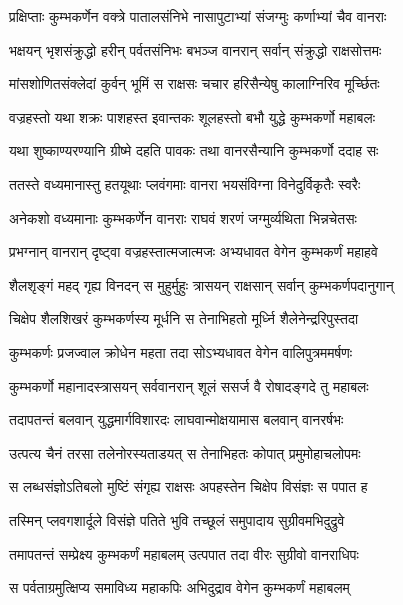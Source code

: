 \twolineshloka
{प्रक्षिप्ताः कुम्भकर्णेन वक्त्रे पातालसंनिभे}
{नासापुटाभ्यां संजग्मुः कर्णाभ्यां चैव वानराः} %

\twolineshloka
{भक्षयन् भृशसंक्रुद्धो हरीन् पर्वतसंनिभः}
{बभञ्ज वानरान् सर्वान् संक्रुद्धो राक्षसोत्तमः} %

\twolineshloka
{मांसशोणितसंक्लेदां कुर्वन् भूमिं स राक्षसः}
{चचार हरिसैन्येषु कालाग्निरिव मूर्च्छितः} %

\twolineshloka
{वज्रहस्तो यथा शक्रः पाशहस्त इवान्तकः}
{शूलहस्तो बभौ युद्धे कुम्भकर्णो महाबलः} %

\twolineshloka
{यथा शुष्काण्यरण्यानि ग्रीष्मे दहति पावकः}
{तथा वानरसैन्यानि कुम्भकर्णो ददाह सः} %

\twolineshloka
{ततस्ते वध्यमानास्तु हतयूथाः प्लवंगमाः}
{वानरा भयसंविग्ना विनेदुर्विकृतैः स्वरैः} %

\twolineshloka
{अनेकशो वध्यमानाः कुम्भकर्णेन वानराः}
{राघवं शरणं जग्मुर्व्यथिता भिन्नचेतसः} %

\twolineshloka
{प्रभग्नान् वानरान् दृष्ट्वा वज्रहस्तात्मजात्मजः}
{अभ्यधावत वेगेन कुम्भकर्णं महाहवे} %

\twolineshloka
{शैलशृङ्गं महद् गृह्य विनदन् स मुहुर्मुहुः}
{त्रासयन् राक्षसान् सर्वान् कुम्भकर्णपदानुगान्} %

\twolineshloka
{चिक्षेप शैलशिखरं कुम्भकर्णस्य मूर्धनि}
{स तेनाभिहतो मूर्ध्नि शैलेनेन्द्ररिपुस्तदा} %

\twolineshloka
{कुम्भकर्णः प्रजज्वाल क्रोधेन महता तदा}
{सोऽभ्यधावत वेगेन वालिपुत्रममर्षणः} %

\twolineshloka
{कुम्भकर्णो महानादस्त्रासयन् सर्ववानरान्}
{शूलं ससर्ज वै रोषादङ्गदे तु महाबलः} %

\twolineshloka
{तदापतन्तं बलवान् युद्धमार्गविशारदः}
{लाघवान्मोक्षयामास बलवान् वानरर्षभः} %

\twolineshloka
{उत्पत्य चैनं तरसा तलेनोरस्यताडयत्}
{स तेनाभिहतः कोपात् प्रमुमोहाचलोपमः} %

\twolineshloka
{स लब्धसंज्ञोऽतिबलो मुष्टिं संगृह्य राक्षसः}
{अपहस्तेन चिक्षेप विसंज्ञः स पपात ह} %

\twolineshloka
{तस्मिन् प्लवगशार्दूले विसंज्ञे पतिते भुवि}
{तच्छूलं समुपादाय सुग्रीवमभिदुद्रुवे} %

\twolineshloka
{तमापतन्तं सम्प्रेक्ष्य कुम्भकर्णं महाबलम्}
{उत्पपात तदा वीरः सुग्रीवो वानराधिपः} %

\twolineshloka
{स पर्वताग्रमुत्क्षिप्य समाविध्य महाकपिः}
{अभिदुद्राव वेगेन कुम्भकर्णं महाबलम्} %

